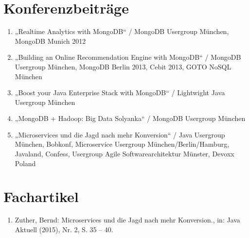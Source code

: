 \section*{Konferenzbeiträge}
\begin{enumerate}[label=,leftmargin=0cm,itemsep=10pt]
\item „Realtime Analytics with MongoDB“ / MongoDB Usergroup München, MongoDB Munich 2012
\item „Building an Online Recommendation Engine with MongoDB“ / MongoDB Usergroup München, MongoDB Berlin 2013, Cebit 2013, GOTO NoSQL München
\item „Boost your Java Enterprise Stack with MongoDB“ / Lightwight Java Usergroup München
\item „MongoDB + Hadoop: Big Data Solyanka“ / MongoDB Usergroup München
\item „Microservices und die Jagd nach mehr Konversion“ / Java Usergroup München, Bobkonf, Microservice  Usergroup München/Berlin/Hamburg, Javaland, Confess, Usergroup Agile Softwarearchitektur Münster, Devoxx Poland
\end{enumerate}

\section*{Fachartikel}
\begin{enumerate}[label=,leftmargin=0cm,itemsep=10pt]
\item Zuther, Bernd: Microservices und die Jagd nach mehr Konversion., in: Java Aktuell (2015), Nr. 2, S. 35 – 40.
\end{enumerate}